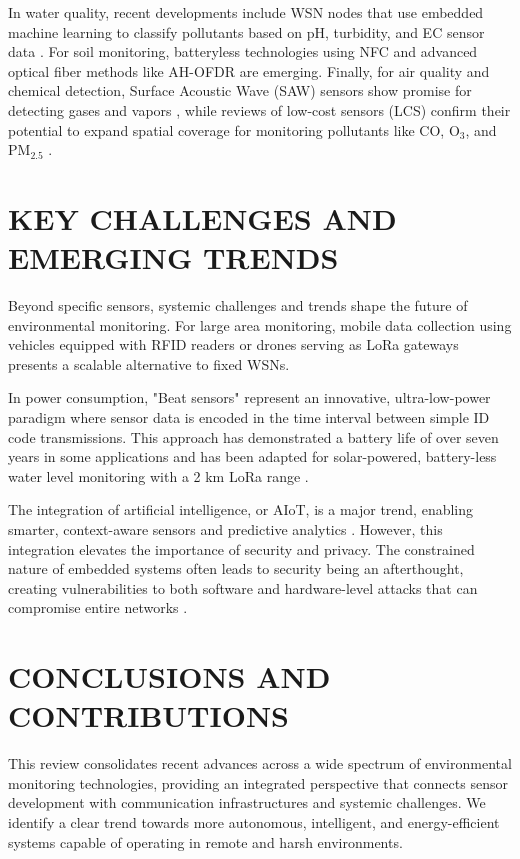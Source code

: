 In water quality, recent developments include WSN nodes that use embedded machine learning to classify pollutants based on pH, turbidity, and EC sensor data \cite{ferreira_2023_conception}. For soil monitoring, batteryless technologies using NFC \cite{boada_2018_batteryless} and advanced optical fiber methods like AH-OFDR \cite{sun_2024_highresolution} are emerging. Finally, for air quality and chemical detection, Surface Acoustic Wave (SAW) sensors show promise for detecting gases and vapors \cite{devkota_2017_saw}, while reviews of low-cost sensors (LCS) confirm their potential to expand spatial coverage for monitoring pollutants like CO, O$_3$, and PM$_{2.5}$ \cite{karagulian_2019_review}.

\section{KEY CHALLENGES AND EMERGING TRENDS}
Beyond specific sensors, systemic challenges and trends shape the future of environmental monitoring. For large area monitoring, mobile data collection using vehicles equipped with RFID readers \cite{deng_2020_novel} or drones serving as LoRa gateways \cite{caruso_2021_drone} presents a scalable alternative to fixed WSNs.

In power consumption, "Beat sensors" represent an innovative, ultra-low-power paradigm where sensor data is encoded in the time interval between simple ID code transmissions. This approach has demonstrated a battery life of over seven years in some applications and has been adapted for solar-powered, battery-less water level monitoring with a 2 km LoRa range \cite{ishibashi_2017_beat, ishibashi_2019_long, dao_2025_lowcost}.

The integration of artificial intelligence, or AIoT, is a major trend, enabling smarter, context-aware sensors and predictive analytics \cite{ghosh_2018_artificial, mukhopadhyay_2021_artificial}. However, this integration elevates the importance of security and privacy. The constrained nature of embedded systems often leads to security being an afterthought, creating vulnerabilities to both software and hardware-level attacks that can compromise entire networks \cite{pimentel_2017_exploring, koulamas_2018_realtime, fournaris_2017_exploiting}.

\section{CONCLUSIONS AND CONTRIBUTIONS}
This review consolidates recent advances across a wide spectrum of environmental monitoring technologies, providing an integrated perspective that connects sensor development with communication infrastructures and systemic challenges. We identify a clear trend towards more autonomous, intelligent, and energy-efficient systems capable of operating in remote and harsh environments.

